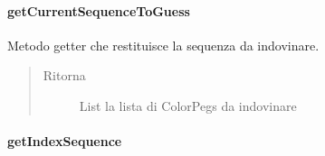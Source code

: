 \documentclass[letterpaper,10pt,italian,openany,oneside]{sphinxmanual}
\begin{document}
\paragraph{getCurrentSequenceToGuess}
\label{\detokenize{source/it/unicam/cs/pa/mastermind/ui/InteractionView:getcurrentsequencetoguess}}

\begin{fulllineitems}
\label{\detokenize{source/it/unicam/cs/pa/mastermind/ui/InteractionView:it.unicam.cs.pa.mastermind.ui.InteractionView.getCurrentSequenceToGuess()}}
Metodo getter che restituisce la sequenza da indovinare.
\begin{quote}\begin{description}
\item[{Ritorna}] \leavevmode
List la lista di ColorPegs da indovinare

\end{description}\end{quote}

\end{fulllineitems}



\paragraph{getIndexSequence}
\label{\detokenize{source/it/unicam/cs/pa/mastermind/ui/InteractionView:getindexsequence}}
\end{document}
